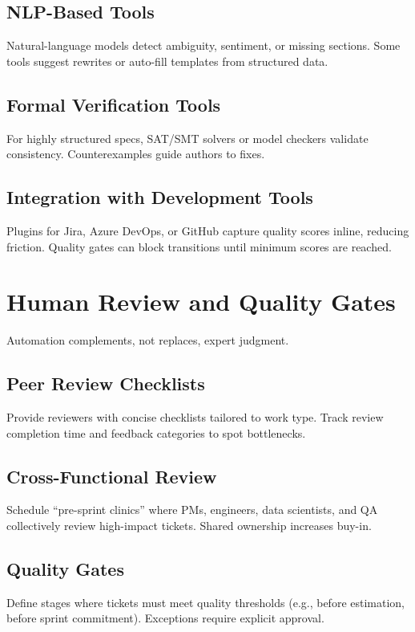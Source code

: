 \subsection{NLP-Based Tools}
Natural-language models detect ambiguity, sentiment, or missing sections. Some tools suggest rewrites or auto-fill templates from structured data.

\subsection{Formal Verification Tools}
For highly structured specs, SAT/SMT solvers or model checkers validate consistency. Counterexamples guide authors to fixes.

\subsection{Integration with Development Tools}
Plugins for Jira, Azure DevOps, or GitHub capture quality scores inline, reducing friction. Quality gates can block transitions until minimum scores are reached.

\section{Human Review and Quality Gates}
\label{sec:human-review}

Automation complements, not replaces, expert judgment.

\subsection{Peer Review Checklists}
Provide reviewers with concise checklists tailored to work type. Track review completion time and feedback categories to spot bottlenecks.

\subsection{Cross-Functional Review}
Schedule ``pre-sprint clinics'' where PMs, engineers, data scientists, and QA collectively review high-impact tickets. Shared ownership increases buy-in.

\subsection{Quality Gates}
Define stages where tickets must meet quality thresholds (e.g., before estimation, before sprint commitment). Exceptions require explicit approval.

